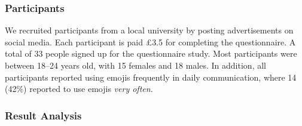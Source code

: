 



\subsubsection{Participants}
We recruited participants from a local university by posting advertisements on social media. Each participant is paid £3.5 for completing the questionnaire.
A total of 33 people signed up for the questionnaire study. 
Most participants were between 18--24 years old, with 15 females and 18 males.
In addition, all participants reported using emojis frequently in daily communication, where 
14 (42\%) reported to use emojis \textit{very often}.

\subsubsection{Result Analysis} %
